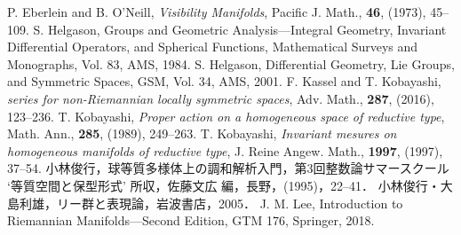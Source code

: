  P. Eberlein and B. O'Neill, \textit{Visibility Manifolds}, Pacific J. Math., \textbf{46}, (1973), 45--109.
 S. Helgason, Groups and Geometric Analysis---Integral Geometry, Invariant Differential Operators, and Spherical Functions, Mathematical Surveys and Monographs, Vol. 83, AMS, 1984.
 S. Helgason, Differential Geometry, Lie Groups, and Symmetric Spaces, GSM, Vol. 34, AMS, 2001.
 F. Kassel and T. Kobayashi, \textit{{\Poincare} series for non-Riemannian locally symmetric spaces}, Adv. Math., \textbf{287}, (2016), 123--236.
 T. Kobayashi, 
  \textit{Proper action on a homogeneous space of reductive type},
  Math. Ann., \textbf{285}, (1989), 249--263.  
 T. Kobayashi, \textit{Invariant mesures on homogeneous manifolds of reductive type}, J. Reine Angew. Math., \textbf{1997}, (1997), 37--54.
 小林俊行，球等質多様体上の調和解析入門，第3回整数論サマースクール `等質空間と保型形式' 所収，佐藤文広 編，長野，(1995)，22--41．
 小林俊行・大島利雄，リー群と表現論，岩波書店，2005．
 J. M. Lee, Introduction to Riemannian Manifolds---Second Edition, GTM 176, Springer, 2018.
